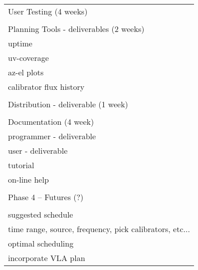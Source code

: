 \begin{longtable}{l}
\\
User Testing (4 weeks)\\
\\
Planning Tools - deliverables (2 weeks)\\
   \hspace{0.25in}uptime \\
   \hspace{0.25in}uv-coverage\\
   \hspace{0.25in}az-el plots\\
   \hspace{0.25in}calibrator flux history\\
\\
Distribution - deliverable (1 week)\\
\\
Documentation (4 week)\\
   \hspace{0.25in}programmer - deliverable\\
   \hspace{0.25in}user - deliverable\\
   \hspace{0.5in}   tutorial\\
   \hspace{0.5in}   on-line help\\
\\
Phase 4 -- Futures (?)\\
\hline\\
   \hspace{0.25in}suggested schedule\\
     \hspace{0.5in}time range, source, frequency, pick calibrators, etc...\\
   \hspace{0.25in}optimal scheduling\\
   \hspace{0.25in}incorporate VLA plan\\
\end{longtable}
